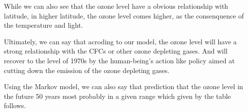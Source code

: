 \documentclass[12pt]{article}
\begin{document}
While we can also see that the ozone level have a obvious relationship with latitude, in higher latitude, the ozone level comes higher, as the consenquence of the temperature and light. 

Ultimately, we can say that acroding to our model, the ozone level will have a strong relationship with the CFCs or other ozone depleting  gases. And will recover to the level of 1970s by the human-being's action like policy aimed at cutting down the emission of the ozone depleting gases. 

Using  the Markov model, we can also say that prediction that the ozone level in the future 50 years most probably in a given range which given by the table follows.




\newpage
\end{document}
